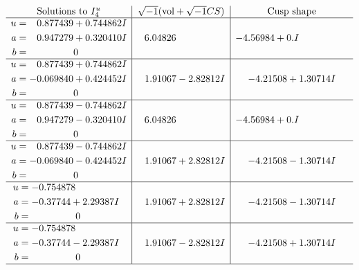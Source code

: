 \documentclass[1p]{elsarticle_modified}
\theoremstyle{definition}
\newcommand{\I}{\sqrt{-1}}
\begin{document}
$$\begin{array}{c|c|c}  
\text{Solutions to }I^u_{4}& \I (\text{vol} + \sqrt{-1}CS) & \text{Cusp shape}\\
 \hline 
\begin{aligned}
u &= \phantom{-}0.877439 + 0.744862 I \\
a &= \phantom{-}0.947279 + 0.320410 I \\
b &= \phantom{-0.000000 } 0\end{aligned}
 & \phantom{-}6.04826\phantom{ +0.000000I} & -4.56984 + 0. I\phantom{ +0.000000I} \\ \hline\begin{aligned}
u &= \phantom{-}0.877439 + 0.744862 I \\
a &= -0.069840 + 0.424452 I \\
b &= \phantom{-0.000000 } 0\end{aligned}
 & \phantom{-}1.91067 - 2.82812 I & -4.21508 + 1.30714 I \\ \hline\begin{aligned}
u &= \phantom{-}0.877439 - 0.744862 I \\
a &= \phantom{-}0.947279 - 0.320410 I \\
b &= \phantom{-0.000000 } 0\end{aligned}
 & \phantom{-}6.04826\phantom{ +0.000000I} & -4.56984 + 0. I\phantom{ +0.000000I} \\ \hline\begin{aligned}
u &= \phantom{-}0.877439 - 0.744862 I \\
a &= -0.069840 - 0.424452 I \\
b &= \phantom{-0.000000 } 0\end{aligned}
 & \phantom{-}1.91067 + 2.82812 I & -4.21508 - 1.30714 I \\ \hline\begin{aligned}
u &= -0.754878\phantom{ +0.000000I} \\
a &= -0.37744 + 2.29387 I \\
b &= \phantom{-0.000000 } 0\end{aligned}
 & \phantom{-}1.91067 + 2.82812 I & -4.21508 - 1.30714 I \\ \hline\begin{aligned}
u &= -0.754878\phantom{ +0.000000I} \\
a &= -0.37744 - 2.29387 I \\
b &= \phantom{-0.000000 } 0\end{aligned}
 & \phantom{-}1.91067 - 2.82812 I & -4.21508 + 1.30714 I\\
 \hline 
 \end{array}$$\newpage\newpage\renewcommand{\arraystretch}{1}
\end{document}
